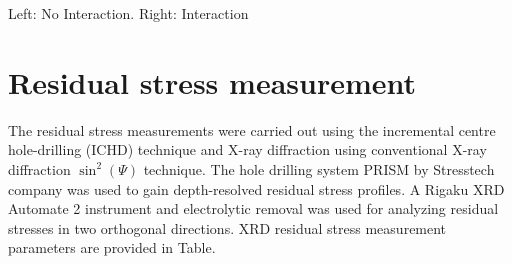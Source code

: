 \qquad %
\caption{Left: No Interaction. Right: Interaction} \label{fig:M} 


    \section*{Residual stress measurement}
    The residual stress measurements were carried out using the incremental centre hole-drilling (ICHD) technique and X-ray diffraction using conventional X-ray diffraction \(\sin ^2(\Psi )\) technique. The hole drilling system PRISM by Stresstech company was used to gain depth-resolved residual stress profiles. A Rigaku XRD Automate 2 instrument and electrolytic removal was used for analyzing residual stresses in two orthogonal directions. XRD residual stress measurement parameters are provided in Table. 

